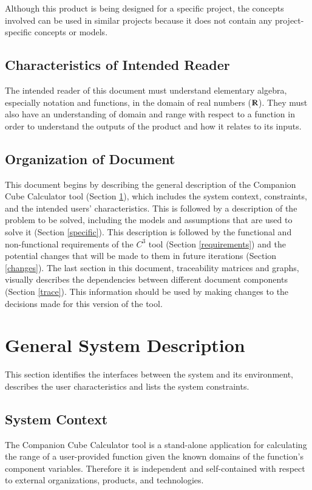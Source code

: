 \documentclass[12pt]{article}
\newcommand{\progname}{Companion Cube Calculator} %
\newcommand{\prognameAbbrv}{$C^{3}$}
\begin{document}
Although this product is being designed for a specific project, the concepts 
involved can be used in similar projects because it does not contain any 
project-specific concepts or models.

\subsection{Characteristics of Intended Reader}
\label{intro_reader}
The intended reader of this document must understand elementary algebra, 
especially notation and functions, in the domain of real numbers 
($\varmathbb{R}$). They must also have an understanding of domain and range 
with respect to a function in order to understand the outputs of the product 
and how it relates to its 
inputs.

\subsection{Organization of Document}
This document begins by describing the general description of the \progname{} 
tool (Section \ref{general}), which includes the system context, constraints, 
and the intended users' characteristics. This is followed by a description of 
the problem to be solved, including the models and assumptions that are used to 
solve it (Section \ref{specific}). This description is followed by the 
functional and non-functional requirements of the \prognameAbbrv{} tool 
(Section \ref{requirements}) and the potential changes that will be made to 
them in future iterations (Section \ref{changes}). The last section in this 
document, traceability matrices and graphs, visually describes the dependencies 
between different document components (Section \ref{trace}). This information 
should be used by making changes to the decisions made for this version of the 
tool.

\section{General System Description}
\label{general}

This section identifies the interfaces between the system and its environment,
describes the user characteristics and lists the system constraints.

\subsection{System Context}
The \progname{} tool is a stand-alone application for calculating the range of 
a user-provided function given the known domains of the function's component 
variables. Therefore it is independent and self-contained with respect to 
external organizations, products, and technologies.
\end{document}
